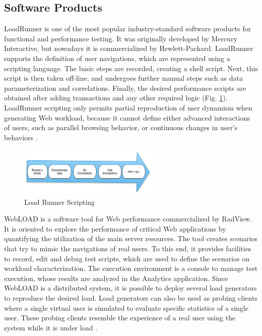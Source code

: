 \documentclass[espaco=umemeio,chapter=TITLE,twoside,openright]{abnt}
\begin{document}
\subsection{Software Products}

LoadRunner is one of the most popular industry-standard software products for functional and performance testing. It was originally developed by Mercury Interactive, but nowadays it is commercialized by Hewlett-Packard. LoadRunner supports the definition of user navigations, which are represented using a scripting language. The basic steps are recorded, creating a shell script. Next, this script is then taken off-line, and undergoes further manual steps such as data parameterization and correlations. Finally, the desired performance scripts are obtained after adding transactions and any other required logic (Fig. \ref{fig:loadrunner}). LoadRunner scripting only permits partial reproduction of user dynamism when generating Web workload, because it cannot define either advanced interactions of users, such as parallel browsing behavior, or continuous changes in user’s behaviors \cite{MohammadS.Obaidat}.

\begin{figure}[!ht]
\centering
\includegraphics[width=0.6\textwidth]{./images/loadrunner.png}
\caption{Load Runner Scripting}
\label{fig:loadrunner}
\end{figure}



WebLOAD is a software tool for Web performance commercialized by RadView. It is oriented to explore the performance of critical Web applications by quantifying the utilization of the main server resources. The tool creates scenarios that try to mimic the navigations of real users. To this end, it provides facilities to record, edit and debug test scripts, which are used to define the scenarios on workload characterization. The execution environment is a console to manage test execution, whose results are analyzed in the Analytics application. Since WebLOAD is a distributed system, it is possible to deploy several load generators to reproduce the desired load. Load generators can also be used as probing clients where a single virtual user is simulated to evaluate specific statistics of a single user. These probing clients resemble the experience of a real user using the system while it is under load \cite{MohammadS.Obaidat}.
\end{document}
